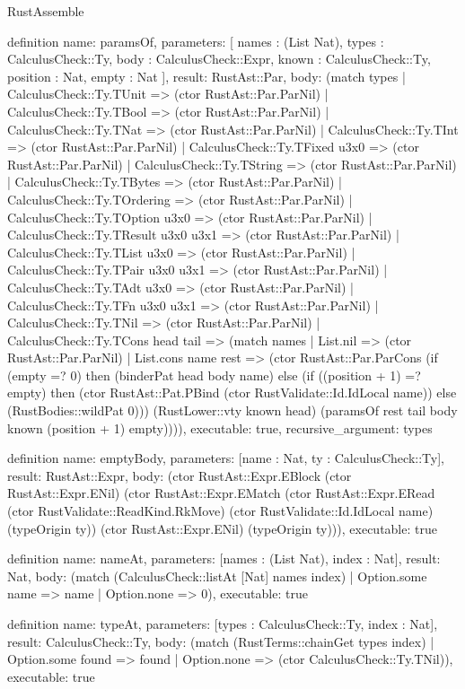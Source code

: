 \begin{lexlean}{RustAssemble}
\begin{semanticmodule}
definition{
  name: paramsOf,
  parameters: [
    names : (List Nat),
    types : CalculusCheck::Ty,
    body : CalculusCheck::Expr,
    known : CalculusCheck::Ty,
    position : Nat,
    empty : Nat
  ],
  result: RustAst::Par,
  body: (match types
    | CalculusCheck::Ty.TUnit => (ctor RustAst::Par.ParNil)
    | CalculusCheck::Ty.TBool => (ctor RustAst::Par.ParNil)
    | CalculusCheck::Ty.TNat => (ctor RustAst::Par.ParNil)
    | CalculusCheck::Ty.TInt => (ctor RustAst::Par.ParNil)
    | CalculusCheck::Ty.TFixed u3x0 => (ctor RustAst::Par.ParNil)
    | CalculusCheck::Ty.TString => (ctor RustAst::Par.ParNil)
    | CalculusCheck::Ty.TBytes => (ctor RustAst::Par.ParNil)
    | CalculusCheck::Ty.TOrdering => (ctor RustAst::Par.ParNil)
    | CalculusCheck::Ty.TOption u3x0 => (ctor RustAst::Par.ParNil)
    | CalculusCheck::Ty.TResult u3x0 u3x1 => (ctor RustAst::Par.ParNil)
    | CalculusCheck::Ty.TList u3x0 => (ctor RustAst::Par.ParNil)
    | CalculusCheck::Ty.TPair u3x0 u3x1 => (ctor RustAst::Par.ParNil)
    | CalculusCheck::Ty.TAdt u3x0 => (ctor RustAst::Par.ParNil)
    | CalculusCheck::Ty.TFn u3x0 u3x1 => (ctor RustAst::Par.ParNil)
    | CalculusCheck::Ty.TNil => (ctor RustAst::Par.ParNil)
    | CalculusCheck::Ty.TCons head tail => (match names
      | List.nil => (ctor RustAst::Par.ParNil)
      | List.cons name rest => (ctor RustAst::Par.ParCons (if (empty =? 0) then (binderPat head body name) else (if ((position + 1) =? empty) then (ctor RustAst::Pat.PBind (ctor RustValidate::Id.IdLocal name)) else (RustBodies::wildPat 0))) (RustLower::vty known head) (paramsOf rest tail body known (position + 1) empty)))),
  executable: true,
  recursive_argument: types
}

definition{
  name: emptyBody,
  parameters: [name : Nat, ty : CalculusCheck::Ty],
  result: RustAst::Expr,
  body: (ctor RustAst::Expr.EBlock (ctor RustAst::Expr.ENil) (ctor RustAst::Expr.EMatch (ctor RustAst::Expr.ERead (ctor RustValidate::ReadKind.RkMove) (ctor RustValidate::Id.IdLocal name) (typeOrigin ty)) (ctor RustAst::Expr.ENil) (typeOrigin ty))),
  executable: true
}

definition{
  name: nameAt,
  parameters: [names : (List Nat), index : Nat],
  result: Nat,
  body: (match (CalculusCheck::listAt [Nat] names index)
    | Option.some name => name
    | Option.none => 0),
  executable: true
}

definition{
  name: typeAt,
  parameters: [types : CalculusCheck::Ty, index : Nat],
  result: CalculusCheck::Ty,
  body: (match (RustTerms::chainGet types index)
    | Option.some found => found
    | Option.none => (ctor CalculusCheck::Ty.TNil)),
  executable: true
}


\end{semanticmodule}
\end{lexlean}
